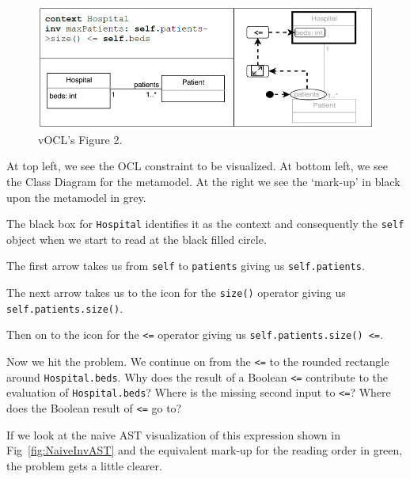 \documentclass{llncs}
\begin{document}
\begin{figure}
	\vspace{-10pt}
	\begin{center}
		\includegraphics[width=4.5in]{vOCLFig2.png}
	\end{center}
	\vspace{-10pt}
	\caption{vOCL's Figure 2.}
	\label{fig:vOCLFig2}
	\vspace{-10pt}
\end{figure}

At top left, we see the OCL constraint to be visualized. At bottom left, we see the Class Diagram for the metamodel. At the right we see the `mark-up' in black upon the metamodel in grey.

The black box for \verb$Hospital$ identifies it as the context and consequently the \verb$self$ object when we start to read at the black filled circle.

The first arrow takes us from \verb$self$ to \verb$patients$ giving us \verb$self.patients$.

The next arrow takes us to the icon for the \verb$size()$ operator giving us \verb$self.patients.size()$.

Then on to the icon for the \verb$<=$ operator giving us \verb$self.patients.size() <=$.

Now we hit the problem. We continue on from the \verb$<=$ to the rounded rectangle around \verb$Hospital.beds$. Why does the result of a Boolean \verb$<=$ contribute to the evaluation of \verb$Hospital.beds$? Where is the missing second input to \verb$<=$? Where does the Boolean result of \verb$<=$ go to?

If we look at the naive AST visualization of this expression shown in Fig~\ref{fig:NaiveInvAST} and the equivalent mark-up for the reading order in green, the problem gets a little clearer.
\end{document}
